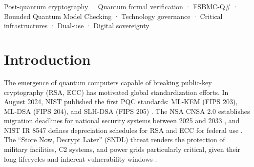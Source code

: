 \documentclass[journal]{IEEEtran} %
\begin{document}
\begin{abstract}
The migration to post-quantum cryptography (PQC) in critical infrastructures demands not only the replacement of
classical algorithms but also the rigorous validation of quantum artifacts employed in auxiliary migration processes prior to execution on real hardware. This paper proposes and demonstrates a symbolic formal verification pipeline based on the ESBMC-Q\# engine, a Verify
Before Execution (VBE) strategy. The pipeline transpiles Q\# programs into symbolic C representations, under both an IEEE 754 encoding and an exact rational encoding over $\mathbb{Z}[\omega]$, injects assertions for physical
unitarity, functional equivalence, and logical fidelity, and exhaustively explores the state space up to bound $k$ via Bounded Quantum
Model Checking (BQMC). The evaluation covers Clifford circuits, a non-Clifford $T$-gate sequence, and a PQC-supporting quantum random number generator; deliberate fault injection demonstrates detection of a phase-flip violation that sampling-based tests miss, and a scalability benchmark reports where SMT solving degrades under symbolic initial states. Each verdict becomes a digitally signed JSON-LD evidence record, mapped to an IM-PQC governance decision by a CI/CD gate. The work targets TRL 4 in the dual-use (civil/defense) context, contributing to digital sovereignty.
\end{abstract}

\begin{IEEEkeywords}
Post-quantum cryptography · Quantum formal verification · ESBMC-Q\# · Bounded Quantum Model Checking · Technology governance · Critical infrastructures · Dual-use · Digital sovereignty
\end{IEEEkeywords}

\section{Introduction}
The emergence of quantum computers capable of breaking public-key cryptography (RSA, ECC) has motivated global standardization efforts. In August 2024, NIST published the first PQC standards: ML-KEM (FIPS 203), ML-DSA (FIPS 204), and SLH-DSA (FIPS 205) \cite{ref1,ref2,ref3}. The NSA CNSA 2.0 establishes migration deadlines for national security systems between 2025 and 2033 \cite{ref4}, and NIST IR 8547 defines depreciation schedules for RSA and ECC for federal use \cite{ref5}. The ``Store Now, Decrypt Later'' (SNDL) threat renders the protection of military facilities, C2 systems, and power grids particularly critical, given their long lifecycles and inherent vulnerability windows \cite{ref6}.
\end{document}
